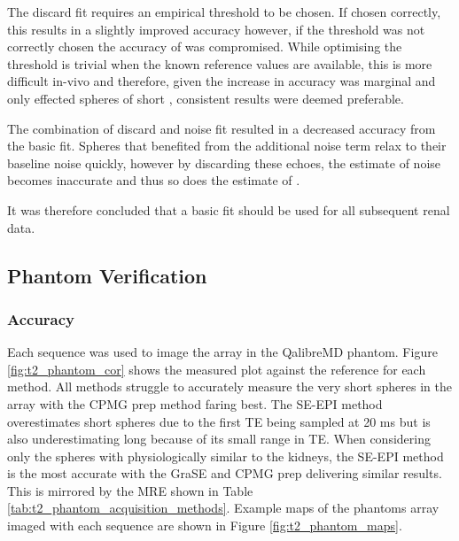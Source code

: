 The discard fit requires an empirical threshold to be chosen. If chosen correctly, this results in a slightly improved accuracy however, if the threshold was not correctly chosen the accuracy of \ttwo was compromised. While optimising the threshold is trivial when the known reference values are available, this is more difficult in-vivo and therefore, given the increase in accuracy was marginal and only effected spheres of short \ttwo, consistent results were deemed preferable.

The combination of discard and noise fit resulted in a decreased accuracy from the basic fit. Spheres that benefited from the additional noise term relax to their baseline noise quickly, however by discarding these echoes, the estimate of noise becomes inaccurate and thus so does the estimate of \ttwo.

It was therefore concluded that a basic fit should be used for all subsequent renal data.

\subsection{Phantom Verification}

\subsubsection{Accuracy}

Each sequence was used to image the \ttwo array in the QalibreMD phantom. Figure \ref{fig:t2_phantom_cor} shows the measured \ttwo plot against the reference \ttwo for each method. All methods struggle to accurately measure the very short \ttwo spheres in the array with the \ac{CPMG} \ttwo prep method faring best. The \ac{SE}-\ac{EPI} method overestimates short \ttwo spheres due to the first \ac{TE} being sampled at 20 ms but is also underestimating long \ttwo because of its small range in \ac{TE}. When considering only the spheres with physiologically similar \ttwo to the kidneys, the \ac{SE}-\ac{EPI} method is the most accurate with the \ac{GraSE} and \ac{CPMG} \ttwo prep delivering similar results. This is mirrored by the \ac{MRE} shown in Table \ref{tab:t2_phantom_acquisition_methods}. Example \ttwo maps of the phantoms \ttwo array imaged with each sequence are shown in Figure \ref{fig:t2_phantom_maps}.


